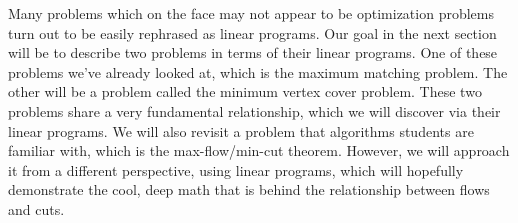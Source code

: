 	Many problems which on the face may not appear to be optimization problems turn out to be 
	easily rephrased as linear programs. Our goal in the next section will be to describe two 
	problems in terms of their linear programs. One of these problems we've already looked at, 
	which is the maximum matching problem. The other will be a problem called the minimum vertex 
	cover problem. These two problems share a very fundamental relationship, which we will discover 
	via their linear programs. We will also revisit a problem that algorithms students are familiar
	with, which is the max-flow/min-cut theorem. However, we will approach it from a different 
	perspective, using linear programs, which will hopefully demonstrate the cool, deep math 
	that is behind the relationship between flows and cuts.
